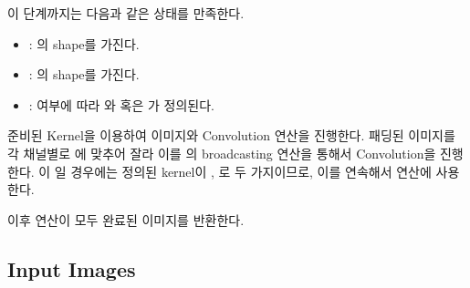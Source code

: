 \documentclass{report}
\begin{document}
이 단계까지는 다음과 같은 상태를 만족한다.

\begin{itemize}
    \item {} : 의 shape를 가진다.
    \item {} : 의 shape를 가진다.
    \item {} :  여부에 따라 와  혹은 가 정의된다.
\end{itemize}

준비된 Kernel을 이용하여 이미지와 Convolution 연산을 진행한다.
패딩된 이미지를 각 채널별로 에 맞추어 잘라 이를 의 broadcasting 연산을 통해서 Convolution을 진행한다.
이 일 경우에는 정의된 kernel이 , 로 두 가지이므로, 이를 연속해서 연산에 사용한다.

이후 연산이 모두 완료된 이미지를 반환한다.

\subsection*{Input Images}
\end{document}
